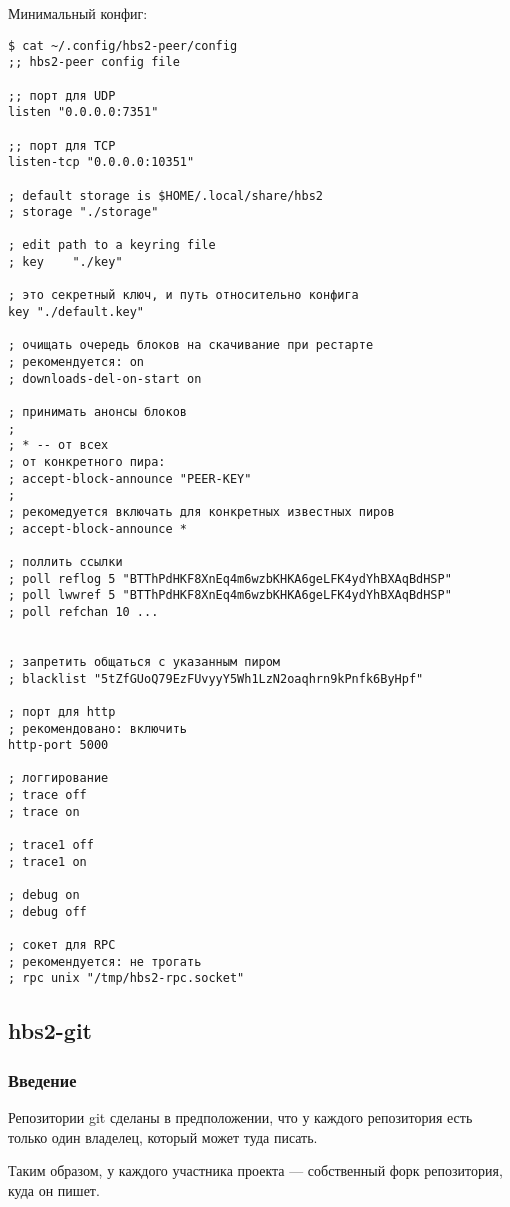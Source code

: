 \documentclass[11pt,a4paper]{article}
\begin{document}
Минимальный конфиг:

\begin{verbatim}
$ cat ~/.config/hbs2-peer/config
;; hbs2-peer config file

;; порт для UDP
listen "0.0.0.0:7351"

;; порт для TCP
listen-tcp "0.0.0.0:10351"

; default storage is $HOME/.local/share/hbs2
; storage "./storage"

; edit path to a keyring file
; key    "./key"

; это секретный ключ, и путь относительно конфига
key "./default.key"

; очищать очередь блоков на скачивание при рестарте
; рекомендуется: on
; downloads-del-on-start on

; принимать анонсы блоков
;
; * -- от всех
; от конкретного пира:
; accept-block-announce "PEER-KEY"
;
; рекомедуется включать для конкретных известных пиров
; accept-block-announce *

; поллить ссылки
; poll reflog 5 "BTThPdHKF8XnEq4m6wzbKHKA6geLFK4ydYhBXAqBdHSP"
; poll lwwref 5 "BTThPdHKF8XnEq4m6wzbKHKA6geLFK4ydYhBXAqBdHSP"
; poll refchan 10 ...


; запретить общаться с указанным пиром
; blacklist "5tZfGUoQ79EzFUvyyY5Wh1LzN2oaqhrn9kPnfk6ByHpf"

; порт для http
; рекомендовано: включить
http-port 5000

; логгирование
; trace off
; trace on

; trace1 off
; trace1 on

; debug on
; debug off

; сокет для RPC
; рекомендуется: не трогать
; rpc unix "/tmp/hbs2-rpc.socket"

\end{verbatim}

\subsection{hbs2-git}

\subsubsection{Введение}

Репозитории git сделаны в предположении, что у каждого репозитория
есть только один владелец, который может туда писать.

Таким образом, у каждого участника проекта --- собственный форк
репозитория, куда он пишет.
\end{document}
